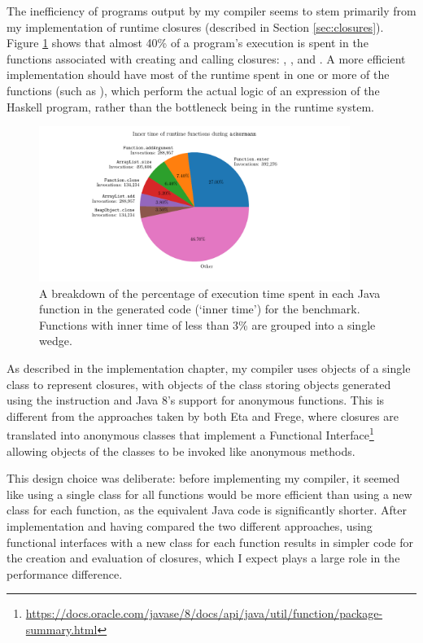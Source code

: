 \documentclass[dissertation.tex]{subfiles}
\begin{document}
{{        The inefficiency of programs output by my compiler seems to stem primarily from my implementation of runtime closures (described in Section \ref{sec:closures}). Figure \ref{fig:inner-time} shows that almost 40\% of a program's execution is spent in the functions associated with creating and calling closures: , , and . A more efficient implementation should have most of the runtime spent in one or more of the  functions (such as ), which perform the actual logic of an expression of the Haskell program, rather than the bottleneck being in the runtime system.

        \begin{figure}[h]
            \centering
            \captionsetup{width=0.8\textwidth}
            \includegraphics[width=0.9\textwidth]{graphs/perf_profile_ackermann.pdf}
            \caption{A breakdown of the percentage of execution time spent in each Java function in the generated code (`inner time') for the  benchmark. Functions with inner time of less than 3\% are grouped into a single wedge.}
            \label{fig:inner-time}
        \end{figure}

        As described in the implementation chapter, my compiler uses objects of a single class to represent closures, with objects of the class storing  objects generated using the  instruction and Java 8's support for anonymous functions. This is different from the approaches taken by both Eta and Frege, where closures are translated into anonymous classes that implement a Functional Interface\footnote{\url{https://docs.oracle.com/javase/8/docs/api/java/util/function/package-summary.html}} allowing objects of the classes to be invoked like anonymous methods.

        This design choice was deliberate: before implementing my compiler, it seemed like using a single class for all functions would be more efficient than using a new class for each function, as the equivalent Java code is significantly shorter. After implementation and having compared the two different approaches, using functional interfaces with a new class for each function results in simpler code for the creation and evaluation of closures, which I expect plays a large role in the performance difference.
    }
}
\end{document}
